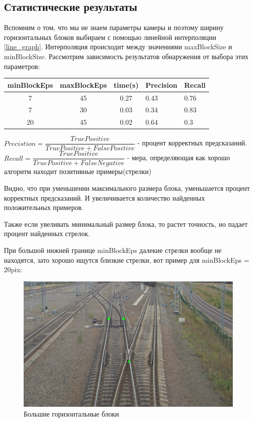 \newpage
\subsection{Статистические результаты}
Вспомним о том, что мы не знаем параметры камеры и поэтому ширину горизонтальных блоков выбираем с помощью линейной интерполяции \ref{line_graph}. Интерполяция происходит между значениями maxBlockSize и minBlockSize. 
Рассмотрим зависимость результатов обнаружения от выбора этих параметров:
\begin{table}[!h]
	\begin{tabular}{|c|c|c|l|l|}
		\hline
		\multicolumn{1}{|l|}{\textbf{minBlockEps}} & \multicolumn{1}{l|}{\textbf{maxBlockEps}} & \multicolumn{1}{l|}{\textbf{time(s)}} & \textbf{Precision} & \textbf{Recall} \\ \hline
		7                                          & 45                                        & 0.27                                   & 0.43               & 0.76            \\ \hline
		7                                          & 30                                        & 0.03                                   & 0.34                & 0.83            \\ \hline
		20                                         & 45                                        & 0.02                                  & 0.64               & 0.3             \\ \hline
	\end{tabular}
\end{table}
\newline
$Precistion = \dfrac{TruePositive}{TruePositive + FalsePositive}$ - процент корректных предсказаний.
\newline
$Recall = \dfrac{TruePositive}{TruePositive + FalseNegative}$ - мера, определяющая как хорошо алгоритм находит позитивные примеры(стрелки)

Видно, что при уменьшении максимального размера блока, уменьшается процент корректных предсказаний. И увеличивается количество найденных положительных примеров. 

Также если увеливать минимальный размер блока, то растет точность, но падает процент найденных стрелок.

При большой нижней границе minBlockEps далекие стрелки вообще не находятся, зато хорошо ищутся близкие стрелки, вот пример для minBlockEps = 20pix:
\begin{figure}[!h]
	\centering
	\includegraphics[width=0.7\linewidth]{pictures/45_20.png}
	\caption[]{Большие горизонтальные блоки}
	\label{fig:45_20}
\end{figure}

